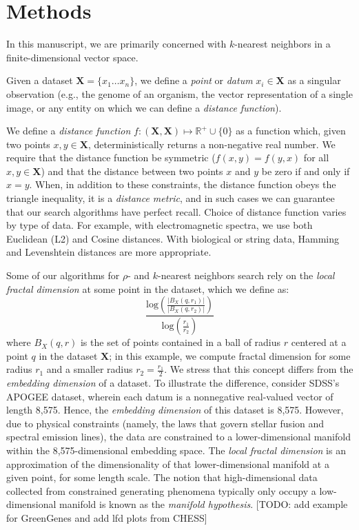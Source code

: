 \section{Methods}
\label{sec:methods}

In this manuscript, we are primarily concerned with $k$-nearest neighbors in a finite-dimensional 
vector space. 

Given a dataset $\textbf{X} = \{x_1 \dots x_n\}$, we define a \emph{point} or \emph{datum} $x_i \in \textbf{X}$ as a singular observation (e.g., the genome of 
an organism, the vector representation of a single image, or any entity on which we can define a \emph{distance function}).

We define a \emph{distance function} $f : (\textbf{X}, \textbf{X}) \mapsto \mathbb{R}^+ \cup \{0\}$ as a function which, 
given two points $x, y \in \textbf{X}$, deterministically returns a non-negative real number. We require that the distance function 
be symmetric ($f(x, y) = f(y, x)$ for all $x, y \in \textbf{X}$) and that the distance between two points $x$ and $y$ be zero if and only if $x = y$. 
When, in addition to these constraints, the distance function obeys
the triangle inequality, it is a \emph{distance metric}, and in such cases we can guarantee that our search algorithms have perfect recall. 
Choice of distance function varies by type of data. For example, with electromagnetic spectra, we use both 
Euclidean (L2) and Cosine distances. With biological or string data, Hamming and Levenshtein distances are more appropriate.


Some of our algorithms for $\rho$- and $k$-nearest neighbors search rely on the \emph{local fractal dimension} at some point in the dataset, 
which we define as: 
\begin{equation} \frac{\text{log}(\frac{|B_X(q, r_1)|}{|B_X(q, r_2)|})}{\text{log}(\frac{r_1}{r_2}) } \label{1} \end{equation}
where $B_X(q, r)$ is the set of points contained in a ball of radius $r$ 
centered at a point $q$ in the dataset $\textbf{X}$; in this example, we compute fractal dimension for some radius $r_1$ and a smaller radius $r_2 = \frac{r_1}{2}$.
We stress that this concept differs from the \emph{embedding dimension} of a dataset. To illustrate the difference,
consider SDSS's APOGEE dataset, wherein each datum is a nonnegative real-valued vector of length 8,575. Hence, the \emph{embedding dimension} of this dataset is 8,575. 
However, due to physical constraints (namely, the laws that govern stellar fusion and spectral emission lines), the data are constrained to a lower-dimensional 
manifold within the 8,575-dimensional embedding space. The \emph{local fractal dimension} is an approximation of the dimensionality of that lower-dimensional manifold at a given point, for some length scale.
The notion that high-dimensional data collected from constrained generating phenomena typically only occupy a low-dimensional manifold is known as the \emph{manifold hypothesis}.
[TODO: add example for GreenGenes and add lfd plots from CHESS]

